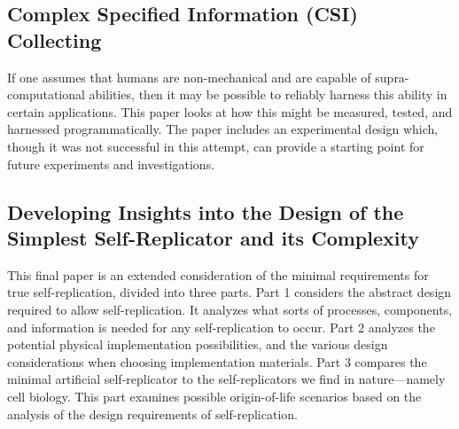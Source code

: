 \subsection*{Complex Specified Information (CSI) Collecting}

If one assumes that humans are non-mechanical and are capable of supra-computational abilities, then
it may be possible to reliably harness this ability in certain applications.  This paper looks at
how this might be measured, tested, and harnessed programmatically.  The paper includes an experimental
design which, though it was not successful in this attempt, can provide a starting point for future
experiments and investigations.

\subsection*{Developing Insights into the Design of the Simplest Self-Replicator and its Complexity}

This final paper is an extended consideration of the minimal requirements for true self-replication, divided
into three parts.  Part 1 considers the abstract design required to allow self-replication.  It analyzes
what sorts of processes, components, and information is needed for any self-replication to occur.  
Part 2 analyzes the potential physical implementation possibilities, and the various design considerations
when choosing implementation materials.  Part 3 compares the minimal artificial self-replicator to 
the self-replicators we find in nature---namely cell biology.  This part examines possible origin-of-life
scenarios based on the analysis of the design requirements of self-replication.


